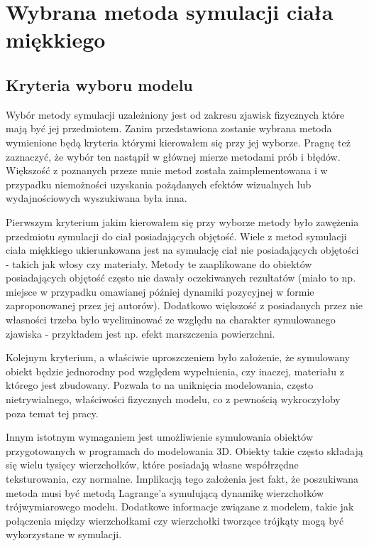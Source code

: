 \chapter{Wybrana metoda symulacji ciała miękkiego}

\section{Kryteria wyboru modelu}

Wybór metody symulacji uzależniony jest od zakresu zjawisk fizycznych które mają
być jej przedmiotem. Zanim przedstawiona zostanie wybrana metoda wymienione będą
kryteria którymi kierowałem się przy jej wyborze.  Pragnę też zaznaczyć, że
wybór ten nastąpił w głównej mierze metodami prób i błędów.  Większość z
poznanych przeze mnie metod została zaimplementowana i w przypadku niemożności
uzyskania pożądanych efektów wizualnych lub wydajnościowych wyszukiwana była
inna.

Pierwszym kryterium jakim kierowałem się przy wyborze metody było zawężenia
przedmiotu symulacji do ciał posiadających objętość. Wiele z metod symulacji
ciała miękkiego ukierunkowana jest na symulację ciał nie posiadających objętości
- takich jak włosy czy materiały. Metody te zaaplikowane do obiektów
posiadających objętość często nie dawały oczekiwanych rezultatów (miało to
		np. miejsce w przypadku omawianej później dynamiki pozycyjnej w formie
		zaproponowanej przez jej autorów). Dodatkowo większość z posiadanych przez nie
własności trzeba było wyeliminować ze względu na charakter symulowanego zjawiska
- przykładem jest np. efekt marszczenia powierzchni.

Kolejnym kryterium, a właściwie uproszczeniem było założenie, że symulowany
obiekt będzie jednorodny pod względem wypełnienia, czy inaczej, materiału z
którego jest zbudowany. Pozwala to na uniknięcia modelowania, często
nietrywialnego, właściwości fizycznych modelu, co z pewnością wykroczyłoby poza
temat tej pracy. 

Innym istotnym wymaganiem jest umożliwienie symulowania obiektów
przygotowanych w programach do modelowania 3D. Obiekty takie często składają się
wielu tysięcy wierzchołków, które posiadają własne współrzędne teksturowania,
czy normalne. Implikacją tego założenia jest fakt, że poszukiwana metoda musi być
metodą Lagrange'a symulującą dynamikę wierzchołków trójwymiarowego modelu.
Dodatkowe informacje związane z modelem, takie jak połączenia między
wierzchołkami czy wierzchołki tworzące trójkąty mogą być wykorzystane w
symulacji.

